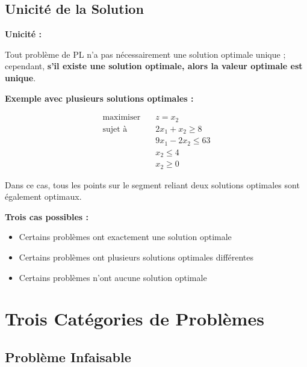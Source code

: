 \documentclass[12pt,a4paper]{article}
\begin{document}
\subsection{Unicité de la Solution}

\begin{important}
\textbf{Unicité :}

Tout problème de PL n'a pas nécessairement une solution optimale unique ; cependant, \textcolor{importantrouge}{\textbf{s'il existe une solution optimale, alors la valeur optimale est unique}}.
\end{important}

\begin{exemple}
\textbf{Exemple avec plusieurs solutions optimales :}

\begin{align*}
\text{maximiser} \quad & z = x_2\\
\text{sujet à} \quad & 2x_1 + x_2 \geq 8\\
& 9x_1 - 2x_2 \leq 63\\
& x_2 \leq 4\\
& x_2 \geq 0
\end{align*}

Dans ce cas, tous les points sur le segment reliant deux solutions optimales sont également optimaux.
\end{exemple}

\begin{astuce}
\textbf{Trois cas possibles :}
\begin{itemize}
    \item \textcolor{defvert}{Certains problèmes ont exactement une solution optimale}
    \item \textcolor{titrebleu}{Certains problèmes ont plusieurs solutions optimales différentes}
    \item \textcolor{importantrouge}{Certains problèmes n'ont aucune solution optimale}
\end{itemize}
\end{astuce}

\newpage
\section{Trois Catégories de Problèmes}

\subsection{Problème Infaisable}
\end{document}
